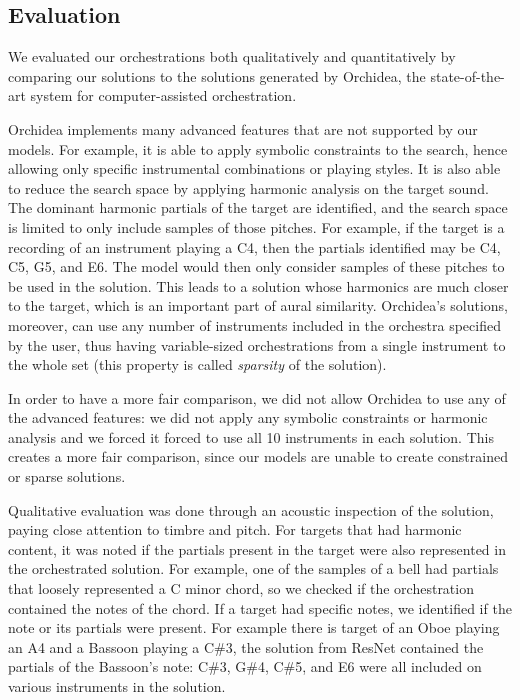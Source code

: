 \documentclass{article}
\begin{document}
\subsection{Evaluation}

We evaluated our orchestrations both qualitatively and quantitatively by comparing our solutions to the solutions generated by Orchidea, the state-of-the-art system for computer-assisted orchestration. 

Orchidea implements many advanced features that are not supported by our models. For example, it is able to apply symbolic constraints to the search, hence allowing only specific instrumental combinations or playing styles. It is also able to reduce the search space by applying harmonic analysis on the target sound.
The dominant harmonic partials of the target are identified, and the search space is limited to only include samples of those pitches. For example, if the target is a recording of an instrument playing a C4, then the partials identified may be C4, C5, G5, and E6. The model would then only consider samples of these pitches to be used in the solution. This leads to a solution whose harmonics are much closer to the target, which is an important part of aural similarity.
Orchidea's solutions, moreover, can use any number of instruments included in the orchestra specified by the user, thus having variable-sized orchestrations from a single instrument to the whole set (this property is called \emph{sparsity} of the solution).

In order to have a more fair comparison, we did not allow Orchidea to use any of the advanced features: we did not apply any symbolic constraints or harmonic analysis and we forced it forced to use all 10 instruments in each solution. This creates a more fair comparison, since our models are unable to create constrained or sparse solutions.

Qualitative evaluation was done through an acoustic inspection of the solution, paying close attention to timbre and pitch. For targets that had harmonic content, it was noted if the partials present in the target were also represented in the orchestrated solution. For example, one of the samples of a bell had partials that loosely represented a C minor chord, so we checked if the orchestration contained the notes of the chord. If a target had specific notes, we identified if the note or its partials were present. For example there is target of an Oboe playing an A4 and a Bassoon playing a C\#3, the solution from ResNet contained the partials of the Bassoon's note: C\#3, G\#4, C\#5, and E6 were all included on various instruments in the solution.
\end{document}
